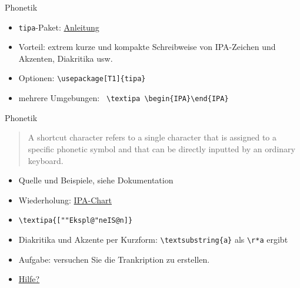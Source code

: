 \begin{frame}[fragile]{Phonetik}
    \begin{itemize}[<+->]
        \item \texttt{tipa}-Paket: \href{ftp://ftp.dante.de/tex-archive/fonts/tipa/tipaman.pdf}{Anleitung}
        \item Vorteil: extrem kurze und kompakte Schreibweise von IPA-Zeichen und Akzenten, Diakritika usw.
        \item Optionen: \lstinline|\usepackage[T1]{tipa}|
        \item mehrere Umgebungen: \lstinline| \textipa \begin{IPA}\end{IPA}|
    \end{itemize}
\end{frame}

\begin{frame}[fragile]{Phonetik}
    \begin{quote}
        A shortcut character refers to a single character that is assigned to a specific phonetic symbol and that can be directly inputted by an ordinary keyboard.
    \end{quote}
    \begin{itemize}[<+->]
        \item Quelle und Beispiele, siehe Dokumentation
        \item Wiederholung: \href{https://www.internationalphoneticassociation.org/sites/default/files/IPA_chart_(C)2005.pdf}{IPA-Chart}
        \item \lstinline|\textipa{[""Ekspl@"neIS@n]}| \is {}
        \item Diakritika und Akzente per Kurzform: \lstinline|\textsubstring{a}| als \lstinline|\r*a| ergibt 
        \item Aufgabe: versuchen Sie die Trankription  zu erstellen.
        \item \href{http://www.ling.ohio-state.edu/events/lcc/tutorials/tipachart/tipachart.pdf}{Hilfe?}
    \end{itemize}
\end{frame}